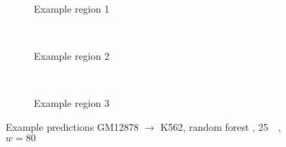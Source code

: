 \begin{figure}[p] %
    \begin{subfigure}{\textwidth}
        \centering
        \caption{Example  region 1} \label{fig:results:randomforest_masterproject_r1}
    \end{subfigure}\\[3mm]
    \begin{subfigure}{\textwidth}
        \centering
        \caption{Example region 2} \label{fig:results:randomforest_masterproject_r2}
    \end{subfigure}\\[3mm]
    \begin{subfigure}{\textwidth}
        \centering
        \caption{Example region 3} \label{fig:results:randomforest_masterproject_r3}
    \end{subfigure}
    \caption{Example predictions GM12878 $\rightarrow$ K562, random forest \cite{Krauth2020}, \SI{25}{\kilo\bp}, $w=80$} 
     \label{fig:results:randomforest_masterproject_matrices}
\end{figure}
